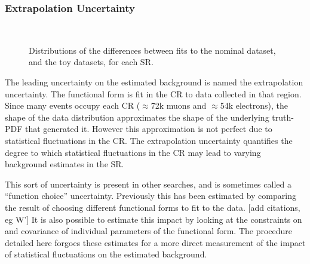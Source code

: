 \subsubsection{Extrapolation Uncertainty}
\begin{figure}[h!]
\captionsetup[subfigure]{position=b}
\centering
{}
 \\
\caption{Distributions of the differences between fits to the nominal dataset, and the toy datasets, for each SR.}
\label{fig:ciBkgEuSyst}
\end{figure}

The leading uncertainty on the estimated background is named the extrapolation uncertainty.
The functional form is fit in the CR to data collected in that region.
Since many events occupy each CR ($\approx$72k muons and $\approx$54k electrons), the shape of the \mll data distribution approximates the shape of the underlying truth-PDF that generated it.
However this approximation is not perfect due to statistical fluctuations in the CR.
The extrapolation uncertainty quantifies the degree to which statistical fluctuations in the CR may lead to varying background estimates in the SR.

This sort of uncertainty is present in other searches, and is sometimes called a ``function choice'' uncertainty.
Previously this has been estimated by comparing the result of choosing different functional forms to fit to the data.  {\color{red} [add citations, eg W']}
It is also possible to estimate this impact by looking at the constraints on and covariance of individual parameters of the functional form.
The procedure detailed here forgoes these estimates for a more direct measurement of the impact of statistical fluctuations on the estimated background.

